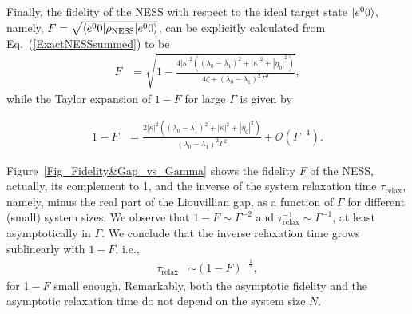\documentclass[aps,pra,letterpaper,twocolumn,showpacs,superscriptaddress,floatfix,longbibliography]{revtex4-1}
\begin{document}
Finally, the fidelity of the NESS with respect to the ideal target
state $|{e^0 0}\rangle$, namely, $F= \sqrt{\langle{e^0 0}| \rho_\mathrm{NESS}
  |{e^0 0}\rangle }$, can be explicitly calculated from
Eq.~(\ref{ExactNESSsummed}) to be
\begin{align}
  F &=\sqrt{1-\frac{4\left|\kappa\right|^{2}
      \left( \left(\lambda_{0}-\lambda_{1}\right)^{2}+\left|\kappa\right|^{2}+
        \left|\eta_{0}\right|^{2}\right) }{4\zeta+
      \left(\lambda_{0}-\lambda_{1}\right)^{2}\Gamma^{2}}},
  \label{FidelityExample3}
\end{align}
while the Taylor expansion of $1-F$ for large $\Gamma$ is given by

\begin{align}
  1-F&=\frac{2\left|\kappa\right|^{2}
    \left( \left(\lambda_{0}-\lambda_{1}\right)^{2}+\left|\kappa\right|^{2}+
      \left|\eta_{0}\right|^{2}\right) }
  {\left(\lambda_{0}-\lambda_{1}\right)^{2}\Gamma^{2}}
  +\mathcal{O}\left(\Gamma^{-4}\right).
\end{align}


Figure~\ref{Fig_Fidelity&Gap_vs_Gamma} shows the fidelity $F$ of the
NESS, actually, its complement to 1, and the inverse of the system
relaxation time $\tau_\mathrm{relax}$, namely, minus the real part of
the Liouvillian gap, as a function of $\Gamma$ for different (small)
system sizes.  We observe that $1-F\sim \Gamma^{-2}$ and
$\tau_\mathrm{relax}^{-1} \sim \Gamma^{-1}$, at least asymptotically
in $\Gamma$. We conclude that the inverse relaxation time grows
sublinearly with $1-F$, i.e.,
\begin{align}
  \tau_\mathrm{relax} &\sim \left(1-F \right)^{-\frac{1}{2}},
\end{align}
for $1-F$ small enough.  Remarkably, both the asymptotic fidelity and
the asymptotic relaxation time do not depend on the system size $N$.
\end{document}
